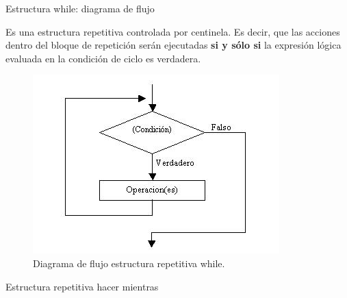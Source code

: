 \documentclass[xcolor=pdftex,table,11pt]{beamer}
\begin{document}
\begin{frame}{Estructura while: diagrama de flujo}

 \begin{block}{}
 Es una estructura repetitiva controlada por centinela. Es decir, que las acciones dentro del bloque de repetición serán ejecutadas \textbf{si y sólo si} la expresión lógica evaluada en la condición de ciclo es verdadera. 
\end{block}
 \begin{figure}
 \centering
\includegraphics[scale=0.5]{../img/exported/while.jpg}
\caption{Diagrama de flujo estructura repetitiva while.}
\end{figure}
\end{frame}

\begin{frame}
\codesetstylefrombeamer
{}
\end{frame}


\begin{frame}{Estructura repetitiva hacer mientras}

\end{frame}
\end{document}
